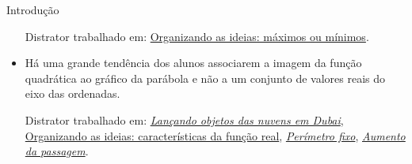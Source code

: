 \begin{apresentacao}{Introdução}
\begin{itemize}
Distrator trabalhado em: \hyperref[\detokenize{AF209-3:sec-funcao-quadratica-org-ideias-quad-max-min-na-quadratica}]{Organizando as ideias: máximos ou mínimos}.

\item {} 
Há uma grande tendência dos alunos associarem a imagem da função quadrática ao gráfico da parábola e não a um conjunto de valores reais do eixo das ordenadas.

Distrator trabalhado em: \hyperref[\detokenize{AF209-0:ativ-funcao-quadratica-lancamento-vertical-em-dubai}]{\textit{Lançando objetos das nuvens em Dubai}}, \hyperref[\detokenize{AF209-2:sec-funcao-quadratica-org-ideias-em-x-a-2}]{Organizando as ideias: características da função real}, \hyperref[\detokenize{AF209-3:sub-ativ-funcao-quadratica-perimetro-fixo}]{\textit{Perímetro fixo}}, \hyperref[\detokenize{AF209-7:ativ-funcao-quadratica-aumento-passagem}]{\textit{Aumento da passagem}}.

\end{itemize}
\end{apresentacao}


